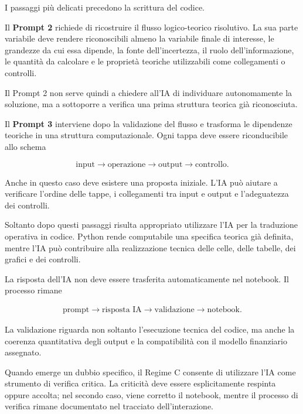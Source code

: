 I passaggi pi\`{u} delicati precedono la scrittura del codice.

Il \textbf{Prompt 2} richiede di ricostruire il flusso logico-teorico
risolutivo. La sua parte variabile deve rendere riconoscibili almeno la
variabile finale di interesse, le grandezze da cui essa dipende, la fonte
dell'incertezza, il ruolo dell'informazione, le quantit\`{a} da calcolare e le
propriet\`{a} teoriche utilizzabili come collegamenti o controlli.

Il Prompt 2 non serve quindi a chiedere all'IA di individuare autonomamente la
soluzione, ma a sottoporre a verifica una prima struttura teorica gi\`{a}
riconosciuta.

Il \textbf{Prompt 3} interviene dopo la validazione del flusso e trasforma le
dipendenze teoriche in una struttura computazionale. Ogni tappa deve essere
riconducibile allo schema

\[
\text{input}
\longrightarrow
\text{operazione}
\longrightarrow
\text{output}
\longrightarrow
\text{controllo}.
\]

Anche in questo caso deve esistere una proposta iniziale. L'IA pu\`{o} aiutare
a verificare l'ordine delle tappe, i collegamenti tra input e output e
l'adeguatezza dei controlli.

Soltanto dopo questi passaggi risulta appropriato utilizzare l'IA per la
traduzione operativa in codice. Python rende computabile una specifica teorica
gi\`{a} definita, mentre l'IA pu\`{o} contribuire alla realizzazione tecnica
delle celle, delle tabelle, dei grafici e dei controlli.

La risposta dell'IA non deve essere trasferita automaticamente nel notebook.
Il processo rimane

\[
\begin{array}{c}
\text{prompt}
\rightarrow
\text{risposta IA}
\rightarrow
\text{validazione}
\rightarrow
\text{notebook}.
\end{array}
\]

La validazione riguarda non soltanto l'esecuzione tecnica del codice, ma anche
la coerenza quantitativa degli output e la compatibilit\`{a} con il modello
finanziario assegnato.

Quando emerge un dubbio specifico, il Regime C consente di utilizzare l'IA
come strumento di verifica critica. La criticit\`{a} deve essere esplicitamente
respinta oppure accolta; nel secondo caso, viene corretto il notebook, mentre il
processo di verifica rimane documentato nel tracciato dell'interazione.

